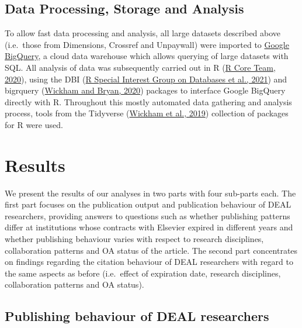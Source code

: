 \documentclass[
]{article}
\begin{document}
\hypertarget{data-processing-storage-and-analysis}{%
\subsection{Data Processing, Storage and Analysis}\label{data-processing-storage-and-analysis}}

To allow fast data processing and analysis, all large datasets described above (i.e.~those from Dimensions, Crossref and Unpaywall) were imported to \href{https://cloud.google.com/bigquery}{Google BigQuery}, a cloud data warehouse which allows querying of large datasets with SQL. All analysis of data was subsequently carried out in R (\href{http://www.R-project.org/}{R Core Team, 2020}), using the DBI (\href{https://CRAN.R-project.org/package=DBI}{R Special Interest Group on Databases et al., 2021}) and bigrquery (\href{https://CRAN.R-project.org/package=bigrquery}{Wickham and Bryan, 2020}) packages to interface Google BigQuery directly with R. Throughout this mostly automated data gathering and analysis process, tools from the Tidyverse (\href{https://doi.org/10.21105/joss.01686}{Wickham et al., 2019}) collection of packages for R were used.

\hypertarget{results}{%
\section{Results}\label{results}}

We present the results of our analyses in two parts with four sub-parts each. The first part focuses on the publication output and publication behaviour of DEAL researchers, providing answers to questions such as whether publishing patterns differ at institutions whose contracts with Elsevier expired in different years and whether publishing behaviour varies with respect to research disciplines, collaboration patterns and OA status of the article.
The second part concentrates on findings regarding the citation behaviour of DEAL researchers with regard to the same aspects as before (i.e.~effect of expiration date, research disciplines, collaboration patterns and OA status).

\hypertarget{publishing-behaviour-of-deal-researchers}{%
\subsection{Publishing behaviour of DEAL researchers}\label{publishing-behaviour-of-deal-researchers}}
\end{document}

